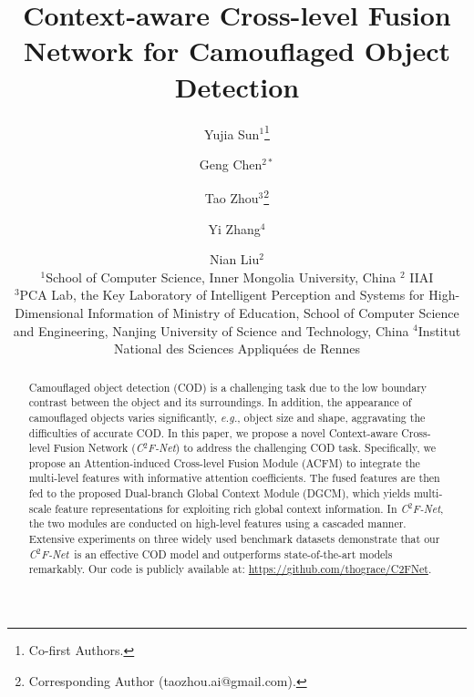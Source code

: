 \documentclass{article}
\title{Context-aware Cross-level Fusion Network for Camouflaged Object Detection }
\author{
Yujia Sun$^{1}$\footnote{Co-first Authors.}\and
Geng Chen$^{2*}$\and
Tao Zhou$^{3}$\footnote{Corresponding Author (taozhou.ai@gmail.com).}\and
Yi Zhang$^4$\and
Nian Liu$^2$\\ 
\affiliations
$^1$School of Computer Science, Inner Mongolia University, China \quad
$^2$ IIAI \\
$^3$PCA Lab, the Key Laboratory of Intelligent Perception and Systems for High-Dimensional Information of Ministry of Education, School of Computer Science and Engineering, Nanjing University of Science and Technology, China \quad
$^4$Institut National des Sciences Appliquées de Rennes \\ 
}
\def\eg{\emph{e.g.}}
\def\OurModel{\textit{C$^2$F-Net}} %
\begin{document}
\maketitle


\begin{abstract}
Camouflaged object detection (COD) is a challenging task due to the low boundary contrast between the object and its surroundings.
In addition, the appearance of camouflaged objects varies significantly, \eg, object size and shape, aggravating the difficulties of accurate COD.
In this paper, we propose a novel Context-aware Cross-level Fusion Network (\OurModel) to address the challenging COD task.
Specifically, we propose an Attention-induced Cross-level Fusion Module (ACFM) to integrate the multi-level features with informative attention coefficients.
The fused features are then fed to the proposed Dual-branch Global Context Module (DGCM), which yields multi-scale feature representations for exploiting rich global context information.
In \OurModel, the two modules are conducted on high-level features using a cascaded manner.
Extensive experiments on three widely used benchmark datasets demonstrate that our \OurModel~is an effective COD model and outperforms state-of-the-art models remarkably. Our code is publicly available at: \href{https://github.com/thograce/C2FNet}{https://github.com/thograce/C2FNet}.
\end{abstract}
\end{document}
